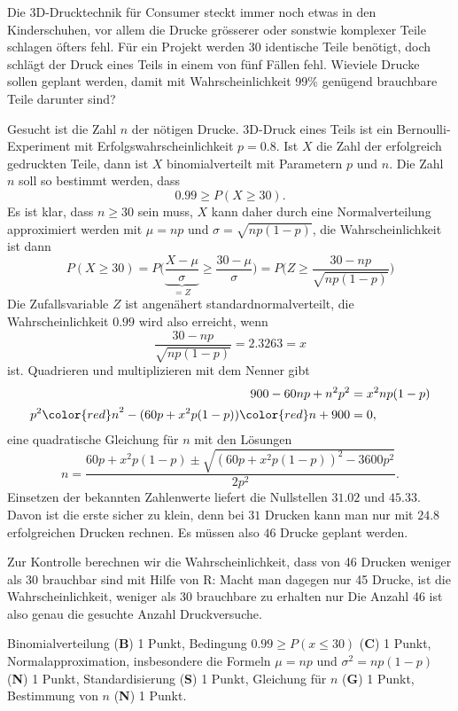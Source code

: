 Die 3D-Drucktechnik für Consumer steckt immer noch etwas in den 
Kinderschuhen, vor allem die Drucke grösserer oder sonstwie komplexer
Teile schlagen öfters fehl.
Für ein Projekt werden 30 identische Teile benötigt,
doch schlägt der Druck eines Teils in einem von fünf Fällen fehl.
Wieviele Drucke sollen geplant werden, damit mit Wahrscheinlichkeit 99\%
genügend brauchbare Teile darunter sind?

\begin{loesung}
Gesucht ist die Zahl $n$ der nötigen Drucke.
3D-Druck eines Teils ist ein Bernoulli-Experiment mit
Erfolgswahrscheinlichkeit $p=0.8$.
Ist $X$ die Zahl der erfolgreich gedruckten Teile, dann ist $X$
binomialverteilt mit Parametern $p$ und $n$.
Die Zahl $n$ soll so bestimmt werden, dass 
\[
0.99 \ge P(X\ge 30).
\]
Es ist klar, dass $n\ge 30$ sein muss, $X$ kann daher durch eine
Normalverteilung approximiert werden mit $\mu=np$ und $\sigma=\sqrt{np(1-p)}$,
die Wahrscheinlichkeit ist dann
\[
P(X\ge 30)=P\biggl(
\underbrace{\frac{X-\mu}{\sigma}}_{=Z}\ge\frac{30-\mu}{\sigma}
\biggr)
=P\biggl(Z\ge \frac{30-np}{\sqrt{np(1-p)}}\biggr)
\]
Die Zufallsvariable $Z$ ist angenähert standardnormalverteilt, die
Wahrscheinlichkeit $0.99$ wird also erreicht, wenn 
\[
\frac{30-np}{\sqrt{np(1-p)}} = 2.3263=x
\]
ist.
Quadrieren und multiplizieren mit dem Nenner gibt
\begin{align*}
900-60np+n^2p^2
&=
x^2 np(1-p)
\\
p^2{\color{red}n}^2-(60p+x^2p(1-p)){\color{red}n}+900&=0,
\end{align*}
eine quadratische Gleichung für $n$ mit den Lösungen
\[
n=\frac{60p+x^2p(1-p)\pm\sqrt{(60p+x^2p(1-p))^2 - 3600p^2}}{2p^2}.
\]
Einsetzen der bekannten Zahlenwerte liefert die Nullstellen $31.02$ und $45.33$.
Davon ist die erste sicher zu klein, denn bei $31$ Drucken kann man nur mit $24.8$ erfolgreichen Drucken rechnen.
Es müssen also $46$ Drucke geplant werden.

Zur Kontrolle berechnen wir die Wahrscheinlichkeit, dass von 46 Drucken
weniger als 30 brauchbar sind mit Hilfe von R:
Macht man dagegen nur 45 Drucke, ist die Wahrscheinlichkeit, weniger als
30 brauchbare zu erhalten nur
Die Anzahl 46 ist also genau die gesuchte Anzahl Druckversuche.
\end{loesung}


\begin{bewertung}
Binomialverteilung ({\bf B}) 1 Punkt,
Bedingung $0.99 \ge P(x\le 30)$ ({\bf C}) 1 Punkt,
Normalapproximation, insbesondere die Formeln $\mu=np$ und $\sigma^2=np(1-p)$
({\bf N}) 1 Punkt,
Standardisierung ({\bf S}) 1 Punkt,
Gleichung für $n$ ({\bf G}) 1 Punkt,
Bestimmung von $n$ ({\bf N}) 1 Punkt.
\end{bewertung}

